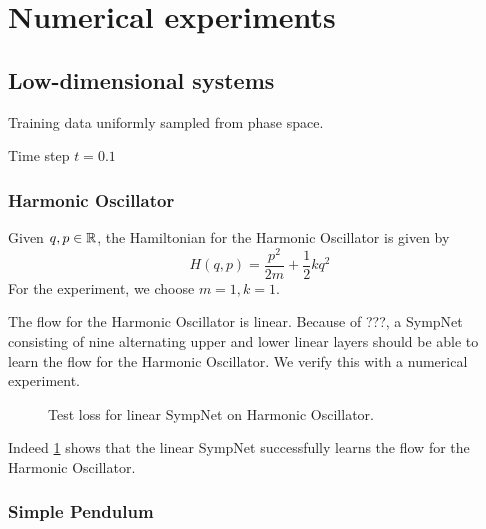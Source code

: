 \documentclass[twoside,a4paper]{article}
\begin{document}
\section{Numerical experiments}

\subsection{Low-dimensional systems}

Training data uniformly sampled from phase space.

Time step $t=0.1$

\subsubsection{Harmonic Oscillator}

Given $q,p \in \mathbb{R}$, the Hamiltonian for the Harmonic Oscillator is given by
\begin{equation*}
	H(q,p) = \frac{p^2}{2m} + \frac{1}{2} kq^2
\end{equation*}
For the experiment, we choose $m=1, k=1$.

The flow for the Harmonic Oscillator is linear. Because of ???, a SympNet consisting of nine alternating 
upper and lower linear layers should be able to learn the flow for the Harmonic Oscillator.
We verify this with a numerical experiment.


\begin{figure}
\centering
{}
\caption{Test loss for linear SympNet on Harmonic Oscillator.}\label{fig_harm_osc_loss}
\end{figure}

Indeed \cref{fig_harm_osc_loss} shows that the linear SympNet successfully 
learns the flow for the Harmonic Oscillator.

\subsubsection{Simple Pendulum}
\end{document}
